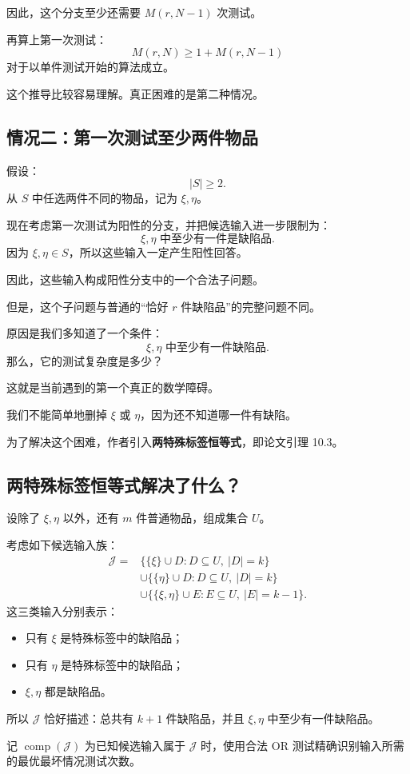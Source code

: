 \documentclass[UTF8,11pt]{ctexart}
\begin{document}
因此，这个分支至少还需要 $M(r,N-1)$ 次测试。

再算上第一次测试：
\[\boxed{M(r,N)\ge1+M(r,N-1)}\]
对于以单件测试开始的算法成立。

这个推导比较容易理解。真正困难的是第二种情况。

\subsection{情况二：第一次测试至少两件物品}
假设：
\[|S|\ge2.\]
从 $S$ 中任选两件不同的物品，记为 $\xi,\eta$。

现在考虑第一次测试为阳性的分支，并把候选输入进一步限制为：
\[\text{$\xi,\eta$ 中至少有一件是缺陷品}.\]
因为 $\xi,\eta\in S$，所以这些输入一定产生阳性回答。

因此，这些输入构成阳性分支中的一个合法子问题。

但是，这个子问题与普通的“恰好 $r$ 件缺陷品”的完整问题不同。

原因是我们多知道了一个条件：
\[\xi,\eta\text{ 中至少有一件缺陷品}.\]
那么，它的测试复杂度是多少？

这就是当前遇到的第一个真正的数学障碍。

我们不能简单地删掉 $\xi$ 或 $\eta$，因为还不知道哪一件有缺陷。

为了解决这个困难，作者引入\textbf{两特殊标签恒等式}，即论文引理 10.3。

\subsection{两特殊标签恒等式解决了什么？}
设除了 $\xi,\eta$ 以外，还有 $m$ 件普通物品，组成集合 $U$。

考虑如下候选输入族：
\[
\begin{aligned}
\mathcal J={}&\{\{\xi\}\cup D:D\subseteq U,\ |D|=k\}\\
&\cup\{\{\eta\}\cup D:D\subseteq U,\ |D|=k\}\\
&\cup\{\{\xi,\eta\}\cup E:E\subseteq U,\ |E|=k-1\}.
\end{aligned}
\]
这三类输入分别表示：
\begin{itemize}
\item 只有 $\xi$ 是特殊标签中的缺陷品；
\item 只有 $\eta$ 是特殊标签中的缺陷品；
\item $\xi,\eta$ 都是缺陷品。
\end{itemize}
所以 $\mathcal J$ 恰好描述：总共有 $k+1$ 件缺陷品，并且 $\xi,\eta$ 中至少有一件缺陷品。

记 $\operatorname{comp}(\mathcal J)$ 为已知候选输入属于 $\mathcal J$ 时，使用合法 OR 测试精确识别输入所需的最优最坏情况测试次数。
\end{document}
